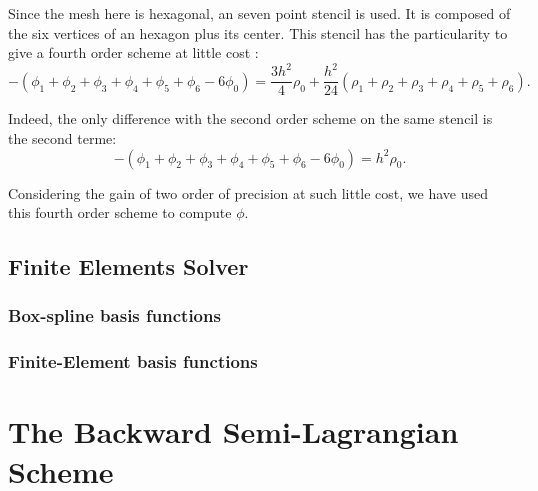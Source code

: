 \documentclass[proc]{edpsmath}
\begin{document}


Since the mesh here is hexagonal, an seven point stencil is used. It is composed of the six vertices of an hexagon plus its center. 
 This stencil has the particularity to give a fourth order scheme at little cost \cite{p} :
\begin{equation*}
-(\phi_1 + \phi_2 + \phi_3 + \phi_4 +\phi_5 + \phi_6 - 6 \phi_0)  = \frac{3h^2}{4} \rho_0 + \frac{h^2}{24}(\rho_1+\rho_2+\rho_3+\rho_4+\rho_5+\rho_6).
\end{equation*} 
%

Indeed, the only difference with the second order scheme on the same stencil is the second terme:  
\begin{equation*}
-(\phi_1 + \phi_2 + \phi_3 + \phi_4 +\phi_5 + \phi_6 - 6 \phi_0)  = h^2 \rho_0.
\end{equation*} 

Considering the gain of two order of precision at such little cost, we have used this fourth order scheme to compute $\phi$.



\subsection{Finite Elements Solver}
\subsubsection{Box-spline basis functions}
\subsubsection{Finite-Element basis functions}


\section{The Backward Semi-Lagrangian Scheme}
\label{sec:BSL_scheme}
\end{document}
